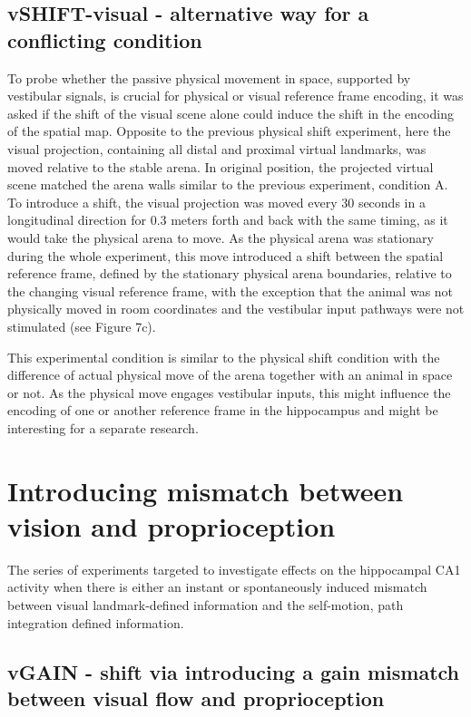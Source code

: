\subsection{vSHIFT-visual - alternative way for a conflicting condition}

To probe whether the passive physical movement in space, supported by vestibular signals, is crucial for physical or visual reference frame encoding, it was asked if the shift of the visual scene alone could induce the shift in the encoding of the spatial map. Opposite to the previous physical shift experiment, here the visual projection, containing all distal and proximal virtual landmarks, was moved relative to the stable arena. In original position, the projected virtual scene matched the arena walls similar to the previous experiment, condition A. To introduce a shift, the visual projection was moved every 30 seconds in a longitudinal direction for 0.3 meters forth and back with the same timing, as it would take the physical arena to move. As the physical arena was stationary during the whole experiment, this move introduced a shift between the spatial reference frame, defined by the stationary physical arena boundaries, relative to the changing visual reference frame, with the exception that the animal was not physically moved in room coordinates and the vestibular input pathways were not stimulated (see Figure 7c).

This experimental condition is similar to the physical shift condition with the difference of actual physical move of the arena together with an animal in space or not. As the physical move engages vestibular inputs, this might influence the encoding of one or another reference frame in the hippocampus and might be interesting for a separate research.


\section{Introducing mismatch between vision and proprioception}
\label{sec:mismatch_gain}

The series of experiments targeted to investigate effects on the hippocampal CA1 activity when there is either an instant or spontaneously induced mismatch between visual landmark-defined information and the self-motion, path integration defined information.

\subsection{vGAIN - shift via introducing a gain mismatch between visual flow and proprioception}

